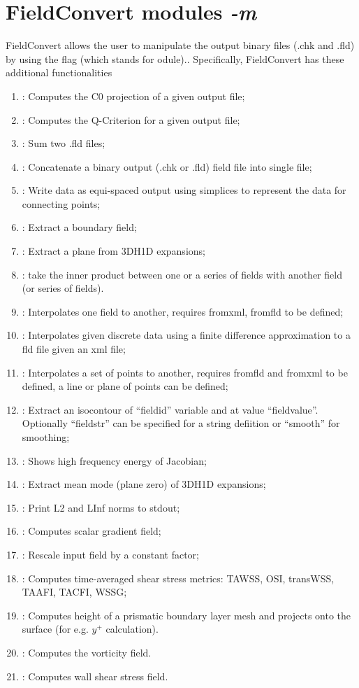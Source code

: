 \section{FieldConvert modules \textit{-m}}
FieldConvert allows the user to manipulate the \nekpp output 
binary files (.chk and .fld) by using the flag  (which 
stands for odule).. 
Specifically, FieldConvert has these additional functionalities
%
\begin{enumerate}
\item {}: Computes the C0 projection of a given output file;
\item {}: Computes the Q-Criterion for a given output file;
\item {}: Sum two .fld files;
\item {}: Concatenate a \nekpp binary output (.chk or .fld) field file into single file;
\item {}: Write data as equi-spaced output using simplices to represent the data for connecting points;
\item {}: Extract a boundary field;
\item {}: Extract a plane from 3DH1D expansions;
\item {}: take the inner product between one or a series of fields with another field (or series of fields). 
\item {}: Interpolates one field to another, requires fromxml, fromfld to be defined;
\item {}: Interpolates given discrete data using a finite difference approximation to a fld file given an xml file;
\item {}: Interpolates a set of points to another, requires fromfld and fromxml to be defined, a line or plane of points can be defined;
\item {}: Extract an isocontour of ``fieldid'' variable and at value ``fieldvalue''. Optionally ``fieldstr'' can be specified for a string defiition or ``smooth'' for smoothing; 
\item {}: Shows high frequency energy of Jacobian;
\item {}: Extract mean mode (plane zero) of 3DH1D expansions;
\item {}: Print L2 and LInf norms to stdout;
\item {}: Computes scalar gradient field;
\item {}: Rescale input field by a constant factor;
\item {}: Computes time-averaged shear stress metrics: TAWSS, OSI, transWSS, TAAFI, TACFI, WSSG;
\item {}: Computes height of a prismatic boundary layer mesh and projects onto the surface (for e.g. $y^+$ calculation).
\item {}: Computes the vorticity field.
\item {}: Computes wall shear stress field.
\end{enumerate}
